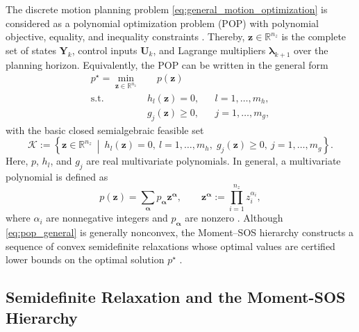 The discrete motion planning problem \eqref{eq:general_motion_optimization} is considered as a 
polynomial optimization problem (POP) 
with polynomial objective, equality, and inequality constraints \cite{Sangli2025}. Thereby,
\(\bm{z}\in\mathbb{R}^{n_z}\) is the complete set of states $\bm{Y}_k$, control
inputs $\bm{U}_k$, and Lagrange multipliers $\bm{\lambda}_{k+1}$ over the planning horizon. 
Equivalently, the POP can be written in the general form
\begin{subequations}\label{eq:pop_general}
\begin{align}
 p^\star = \min_{\bm{z}\in\mathbb{R}^{n_z}}
 &\quad p(\bm{z})
 \label{eq:pop_general_objective}\\
 \text{s.t.}\quad
 &h_l(\bm{z})=0, &&l=1,\ldots,m_h,
 \label{eq:pop_general_equalities}\\
 &g_j(\bm{z})\geq 0, &&j=1,\ldots,m_g,
 \label{eq:pop_general_inequalities}
\end{align}
\end{subequations}
with the basic closed semialgebraic feasible set
\begin{equation}
 \mathcal{K}:=
 \left\{\bm{z}\in\mathbb{R}^{n_z}\ \middle|\
 h_l(\bm{z})=0,\ l=1,\ldots,m_h,\;
 g_j(\bm{z})\geq0,\ j=1,\ldots,m_g\right\}.
 \label{eq:pop_feasible_set}
\end{equation}
Here, \(p\), \(h_l\), and \(g_j\) are real multivariate polynomials. In general,
a multivariate polynomial is defined as
\begin{equation}
 p(\bm{z})=\sum_{\bm{\alpha}}p_{\bm{\alpha}}\bm{z}^{\bm{\alpha}},
 \qquad
 \bm{z}^{\bm{\alpha}}:=\prod_{i=1}^{n_z}z_i^{\alpha_i},
 \label{eq:multivariate_polynomial}
\end{equation} 
where $\alpha_i$ are nonnegative integers and \(p_{\bm{\alpha}}\) are nonzero \cite{Yang2024Semidefinite}.
Although \eqref{eq:pop_general} is generally nonconvex, the Moment--SOS hierarchy constructs a
sequence of convex semidefinite relaxations whose optimal values are certified
lower bounds on the optimal solution \(p^\star\) \cite{Yang2024Semidefinite}.

\subsection{Semidefinite Relaxation and the Moment-SOS Hierarchy}
\label{subsec:moment_sos_hierarchy}


